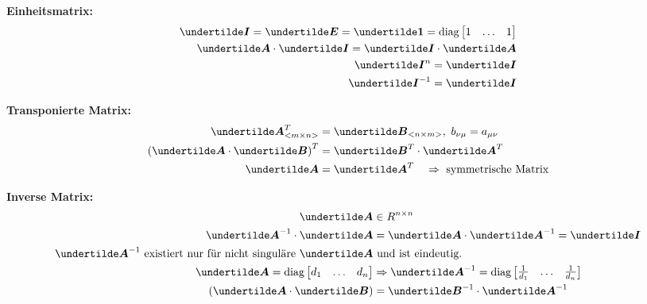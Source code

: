 \textbf{Einheitsmatrix:}
\begin{align*}
\ma{I} = \ma{E} = \ma{1} = \text{diag}\begin{bmatrix}1 & \ldots & 1\end{bmatrix}\\
\ma{A} \cdot \ma{I} = \ma{I} \cdot \ma{A}\\
\ma{I}^n = \ma{I}\\
\ma{I}^{-1} = \ma{I}
\end{align*}

\textbf{Transponierte Matrix:}
\begin{align*}
\ma{A}_{<m\times n>}^T &= \ma{B}_{<n\times m>},\ b_{\nu\mu} = a_{\mu\nu}\\
\left(\ma{A} \cdot \ma{B}\right)^T &= \ma{B}^T \cdot \ma{A}^T\\
\ma{A} &= \ma{A}^T \quad \Rightarrow \text{ symmetrische Matrix}
\end{align*}

\textbf{Inverse Matrix:}
\begin{align*}
\ma{A} &\in R^{n\times n}\\
\ma{A}^{-1} \cdot \ma{A} &= \ma{A} \cdot \ma{A}^{-1} = \ma{I}\\
\text{$\ma{A}^{-1}$ existiert nur für nicht singuläre $\ma{A}$}&\text{ und ist eindeutig.}\\
\ma{A} = \text{diag}\begin{bmatrix}d_1 & \ldots & d_n\end{bmatrix} & \Rightarrow \ma{A}^{-1} = \text{diag}\begin{bmatrix}\frac{1}{d_1} & \ldots & \frac{1}{d_n}\end{bmatrix}\\
\left(\ma{A} \cdot \ma{B}\right) &= \ma{B}^{-1} \cdot \ma{A}^{-1}
\end{align*}


